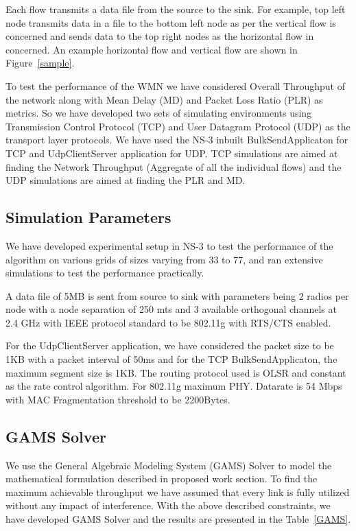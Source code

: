\documentclass[conference]{IEEEtran}
\begin{document}
Each flow transmits a data file from the source to the sink. 
For example, top left node transmits data in a file to the bottom left node as per the vertical flow is concerned and sends data to the top right nodes as the horizontal flow in concerned. 
An example horizontal flow and vertical flow are shown in Figure~\ref{sample}.

To test the performance of the WMN we have considered Overall Throughput of the network along with Mean Delay (MD) and Packet Loss Ratio (PLR) as metrics.
So we have developed two sets of simulating environments using Transmission Control Protocol (TCP) and User Datagram Protocol (UDP) as the transport layer protocols. 
We have used the NS-3 inbuilt BulkSendApplicaton for TCP and UdpClientServer application for UDP. 
TCP simulations are aimed at finding the Network Throughput (Aggregate of all the individual flows) and the UDP simulations are aimed at finding the PLR and MD.
 
 
 \subsection{Simulation Parameters}

We have developed experimental setup in NS-3 \cite{henderson2008network} to test the performance of the algorithm on various grids of sizes varying from 33 to 77,
and ran extensive simulations to test the performance practically.

A data file of 5MB is sent from source to sink with parameters being 2 radios per node with a node separation of 250 mts and 3 available orthogonal channels at 2.4 GHz with IEEE protocol standard
to be 802.11g with RTS/CTS enabled.

For the UdpClientServer application, we have considered the packet size to be 1KB with a packet interval of 50ms and for the TCP BulkSendApplicaton, the maximum segment size is 1KB.
The routing protocol used is OLSR and constant as the rate control algorithm. For 802.11g maximum PHY. Datarate is 54 Mbps with MAC Fragmentation threshold to be 2200Bytes.


\subsection{GAMS Solver}
We use the General Algebraic Modeling System (GAMS) \cite{gams} Solver to model the mathematical formulation described in proposed work section.
To find the maximum achievable throughput we have assumed that every link is fully utilized without any impact of interference.
With the above described constraints, we have developed GAMS Solver and the results are presented in the Table~\ref{GAMS}.
\end{document}
